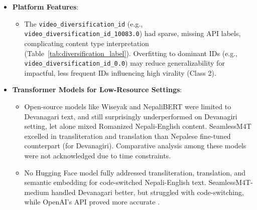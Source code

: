 \documentclass[12pt,a4paper]{report}
\begin{document}
\begin{itemize}
    \item \textbf{Platform Features}:
        \begin{itemize}
            \item The \texttt{video\_diversification\_id} (e.g., \texttt{video\_diversification\_id\_10083.0}) had sparse, missing API labels, complicating content type interpretation (Table~\ref{tab:diversification_label}). Overfitting to dominant IDs (e.g., \texttt{video\_diversification\_id\_0.0}) may reduce generalizability for impactful, less frequent IDs influencing high virality (Class 2).
        \end{itemize}
\newpage
    \item \textbf{Transformer Models for Low-Resource Settings}:
        \begin{itemize}
            \item Open-source models like Wiseyak \parencite{duwal2024domainadaptativecontinuallearninglowresource} and NepaliBERT \parencite{Pudasaini2023NepaliBERT} were limited to Devanagari text, and still surprisingly underperformed on Devanagiri setting, let alone mixed Romanized Nepali-English content. SeamlessM4T \parencite{elbayad2023seamlessm4t, facebookresearch2023seamlessm4t, huggingface2024seamlessm4t} excelled in transliteration and translation than Nepalese fine-tuned counterpart (for Devanagiri). Comparative analysis among these models were not acknowledged due to time constraints.
            \item No Hugging Face model fully addressed transliteration, translation, and semantic embedding for code-switched Nepali-English text. SeamlessM4T-medium handled Devanagari better, but struggled with code-switching, while OpenAI’s API proved more accurate \parencite{reddit2023gpt4nepali}.
        \end{itemize}
\end{itemize}
\end{document}
